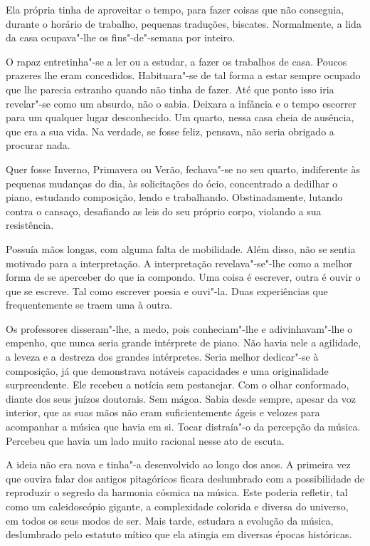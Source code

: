 Ela própria tinha de aproveitar o tempo, para fazer coisas que não
conseguia, durante o horário de trabalho, pequenas traduções, biscates.
Normalmente, a lida da casa ocupava"-lhe os fins"-de"-semana por inteiro.

O rapaz entretinha"-se a ler ou a estudar, a fazer os trabalhos de casa.
Poucos prazeres lhe eram concedidos. Habituara"-se de tal forma a estar
sempre ocupado que lhe parecia estranho quando não tinha de fazer. Até
que ponto isso iria revelar"-se como um absurdo, não o sabia. Deixara a
infância e o tempo escorrer para um qualquer lugar desconhecido. Um
quarto, nessa casa cheia de ausência, que era a sua vida. Na verdade, se
fosse feliz, pensava, não seria obrigado a procurar nada.

Quer fosse Inverno, Primavera ou Verão, fechava"-se no seu quarto,
indiferente às pequenas mudanças do dia, às solicitações do ócio,
concentrado a dedilhar o piano, estudando composição, lendo e
trabalhando. Obstinadamente, lutando contra o cansaço, desafiando as
leis do seu próprio corpo, violando a sua resistência.

Possuía mãos longas, com alguma falta de mobilidade. Além disso, não se
sentia motivado para a interpretação. A interpretação revelava"-se"-lhe
como a melhor forma de se aperceber do que ia compondo. Uma coisa é
escrever, outra é ouvir o que se escreve. Tal como escrever poesia e
ouvi"-la. Duas experiências que frequentemente se traem uma à outra.

Os professores disseram"-lhe, a medo, pois conheciam"-lhe e
adivinhavam"-lhe o empenho, que nunca seria grande intérprete de piano.
Não havia nele a agilidade, a leveza e a destreza dos grandes
intérpretes. Seria melhor dedicar"-se à composição, já que demonstrava
notáveis capacidades e uma originalidade surpreendente. Ele recebeu a
notícia sem pestanejar. Com o olhar conformado, diante dos seus juízos
doutorais. Sem mágoa. Sabia desde sempre, apesar da voz interior, que as
suas mãos não eram suficientemente ágeis e velozes para acompanhar a
música que havia em si. Tocar distraía"-o da percepção da música.
Percebeu que havia um lado muito racional nesse ato de escuta.

A ideia não era nova e tinha"-a desenvolvido ao longo dos anos. A
primeira vez que ouvira falar dos antigos pitagóricos ficara deslumbrado
com a possibilidade de reproduzir o segredo da harmonia cósmica na
música. Este poderia refletir, tal como um caleidoscópio gigante, a
complexidade colorida e diversa do universo, em todos os seus modos de
ser. Mais tarde, estudara a evolução da música, deslumbrado pelo
estatuto mítico que ela atingia em diversas épocas históricas.


